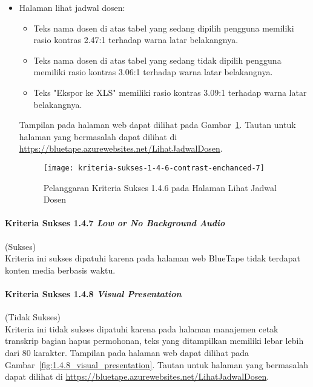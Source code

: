 \begin{itemize}
    \item Halaman lihat jadwal dosen: 
    \begin{itemize}
        \item Teks nama dosen di atas tabel yang sedang dipilih pengguna memiliki rasio kontras 2.47:1 terhadap warna latar belakangnya.
        \item Teks nama dosen di atas tabel yang sedang tidak dipilih pengguna memiliki rasio kontras 3.06:1 terhadap warna latar belakangnya.
        \item Teks "Ekspor ke XLS" memiliki rasio kontras 3.09:1 terhadap warna latar belakangnya.
    \end{itemize}
    Tampilan pada halaman web dapat dilihat pada \mbox{Gambar \ref{fig:1.4.6_contrast_enchanced_7}}. Tautan untuk halaman yang bermasalah dapat dilihat di \url{https://bluetape.azurewebsites.net/LihatJadwalDosen}.
    \begin{figure}[H]
        \centering  
        \texttt{[image: kriteria-sukses-1-4-6-contrast-enchanced-7]}  
        \caption[Pelanggaran Kriteria Sukses 1.4.6 pada Halaman Lihat Jadwal Dosen]{Pelanggaran Kriteria Sukses 1.4.6 pada Halaman Lihat Jadwal Dosen}
        \label{fig:1.4.6_contrast_enchanced_7}  
    \end{figure} 
\end{itemize}

\newpage

\paragraph{Kriteria Sukses 1.4.7 \textit{Low or No Background Audio}}
\label{par:kepatuhan_bluetape_kriteria_sukses_1.4.7}
(Sukses)\\

Kriteria ini sukses dipatuhi karena pada halaman web BlueTape tidak terdapat konten media berbasis waktu.

\paragraph{Kriteria Sukses 1.4.8 \textit{Visual Presentation}}
\label{par:kepatuhan_bluetape_kriteria_sukses_1.4.8}
(Tidak Sukses)\\

Kriteria ini tidak sukses dipatuhi karena pada halaman manajemen cetak transkrip bagian hapus permohonan, teks yang ditampilkan memiliki lebar lebih dari 80 karakter. Tampilan pada halaman web dapat dilihat pada \mbox{Gambar \ref{fig:1.4.8_visual_presentation}}. Tautan untuk halaman yang bermasalah dapat dilihat di \url{https://bluetape.azurewebsites.net/LihatJadwalDosen}.

